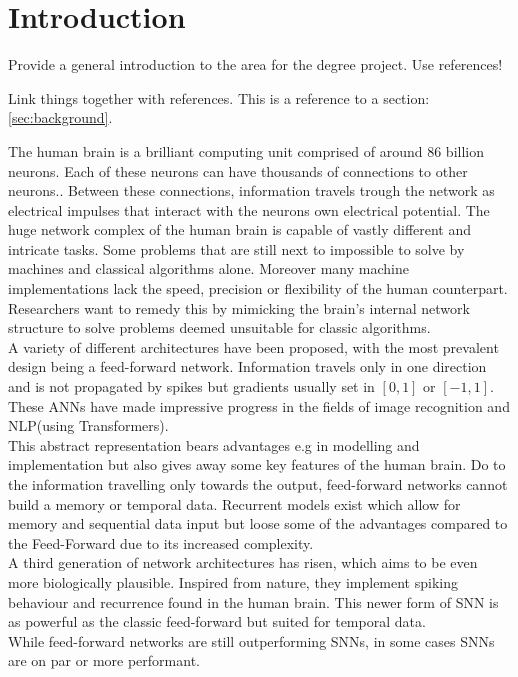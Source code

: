 \chapter{Introduction}

Provide a general introduction to the area for the degree project. Use references!

Link things together with references. This is a reference to a section: \ref{sec:background}.



The human brain is a brilliant computing unit comprised of around 86 billion\cite{azevedo_equal_2009} neurons. Each of these neurons can have thousands of connections to other neurons.. Between these connections, information travels trough the network as electrical impulses that interact with the neurons own electrical potential. The huge network complex of the human brain is capable of vastly different and intricate tasks. Some problems that are still next to impossible to solve by machines and classical algorithms alone. Moreover many machine implementations lack the speed, precision or flexibility of the human counterpart.\\
Researchers want to remedy this by mimicking the brain's internal network structure to solve problems deemed unsuitable for classic algorithms.\\
A variety of different architectures have been proposed, with the most prevalent design being a feed-forward network. Information travels only in one direction and is not propagated by spikes but gradients usually set in $[0,1]$ or $[-1,1]$.
These \acp{ANN} have made impressive progress in the fields of image recognition and \ac{NLP}(using Transformers).\\
This abstract representation bears advantages e.g in modelling and implementation but also gives away some key features of the human brain. Do to the information travelling only towards the output, feed-forward networks cannot build a memory or temporal data. Recurrent models exist which allow for memory  and sequential data input but loose some of the advantages compared to the Feed-Forward due to its increased complexity.\\
A third generation of network architectures has risen, which aims to be even more biologically plausible. Inspired from nature, they implement spiking behaviour and recurrence found in the human brain.
This newer form of \ac{SNN} is as powerful as the classic feed-forward but suited for temporal data.\\
While feed-forward networks are still outperforming \acp{SNN}, in some cases \acp{SNN} are on par or more performant.

